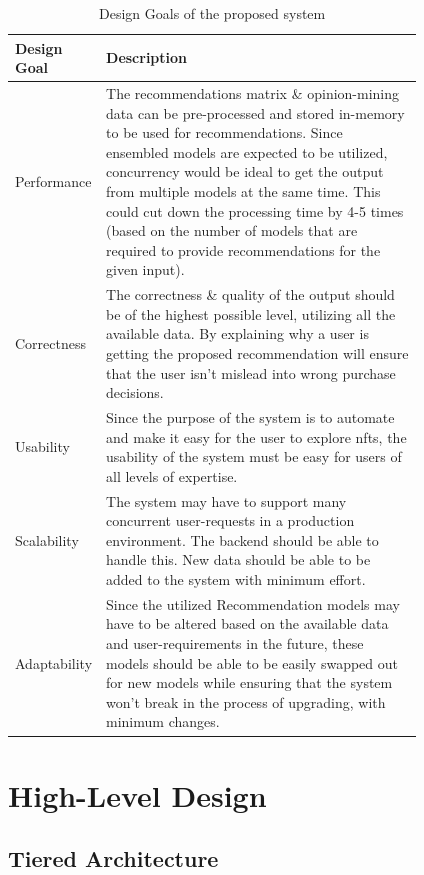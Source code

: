 \begin{table}[h!]
\caption{Design Goals of the proposed system}
{ 
\begin{tabular}{|l|p{0.81\linewidth}|}
\hline
\textbf{Design Goal} & \textbf{Description}\\
\hline
Performance & The recommendations matrix \& opinion-mining data can be pre-processed and stored in-memory to be used for recommendations. Since ensembled models are expected to be utilized, concurrency would be ideal to get the output from multiple models at the same time. This could cut down the processing time by 4-5 times (based on the number of models that are required to provide recommendations for the given input). \\ 
\hline
Correctness & The correctness \& quality of the output should be of the highest possible level, utilizing all the available data. By explaining why a user is getting the proposed recommendation will ensure that the user isn't mislead into wrong purchase decisions. \\ 
\hline
Usability & Since the purpose of the system is to automate and make it easy for the user to explore \gls{nft}s, the usability of the system must be easy for users of all levels of expertise. \\ 
\hline
Scalability & The system may have to support many concurrent user-requests in a production environment. The backend should be able to handle this. New data should be able to be added to the system with minimum effort. \\
\hline
Adaptability & Since the utilized Recommendation models may have to be altered based on the available data and user-requirements in the future, these models should be able to be easily swapped out for new models while ensuring that the system won't break in the process of upgrading, with minimum changes. \\
\hline
\end{tabular}
}
\end{table}

\section{High-Level Design}


\subsection{Tiered Architecture}

